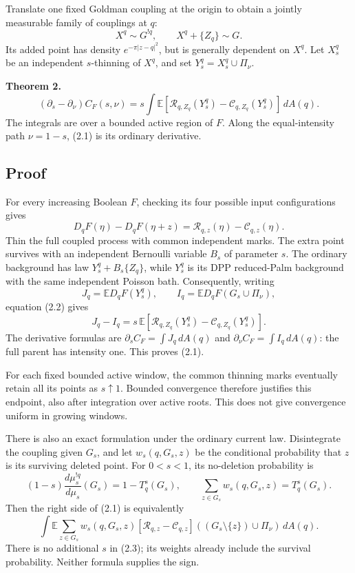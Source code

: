 \documentclass[11pt,a4paper]{article}
\theoremstyle{definition}
\theoremstyle{remark}
\numberwithin{equation}{section}
\begin{document}
Translate one fixed Goldman coupling at the origin to obtain a jointly measurable family of couplings at \(q\): \[
X^q\sim G^{!q},\qquad X^q+\{Z_q\}\sim G.
\] Its added point has density \(e^{-\pi|z-q|^2}\), but is generally dependent on \(X^q\). Let \(X_s^q\) be an independent \(s\)-thinning of \(X^q\), and set \(Y_s^q=X_s^q\cup\Pi_\nu\).

\textbf{Theorem 2.} \[
\boxed{\quad
(\partial_s-\partial_\nu)C_F(s,\nu)
=s\int
\mathbb E\!\left[
 \mathcal R_{q,Z_q}(Y_s^q)-\mathcal C_{q,Z_q}(Y_s^q)
\right]\,dA(q).
\quad}
\tag{2.1}
\] The integrals are over a bounded active region of \(F\). Along the equal-intensity path \(\nu=1-s\), (2.1) is its ordinary derivative.

\hypertarget{proof}{%
\subsection{Proof}\label{proof}}

For every increasing Boolean \(F\), checking its four possible input configurations gives \[
D_qF(\eta)-D_qF(\eta+z)
=\mathcal R_{q,z}(\eta)-\mathcal C_{q,z}(\eta).
\tag{2.2}
\] Thin the full coupled process with common independent marks. The extra point survives with an independent Bernoulli variable \(B_s\) of parameter \(s\). The ordinary background has law \(Y_s^q+B_s\{Z_q\}\), while \(Y_s^q\) is its DPP reduced-Palm background with the same independent Poisson bath. Consequently, writing \[
J_q=\mathbb ED_qF(Y_s^q),\qquad
I_q=\mathbb ED_qF(G_s\cup\Pi_\nu),
\] equation (2.2) gives \[
J_q-I_q
=s\,\mathbb E[
\mathcal R_{q,Z_q}(Y_s^q)-\mathcal C_{q,Z_q}(Y_s^q)].
\] The derivative formulas are \(\partial_s C_F=\int J_q\,dA(q)\) and \(\partial_\nu C_F=\int I_q\,dA(q)\): the full parent has intensity one. This proves (2.1).

For each fixed bounded active window, the common thinning marks eventually retain all its points as \(s\uparrow1\). Bounded convergence therefore justifies this endpoint, also after integration over active roots. This does not give convergence uniform in growing windows.

There is also an exact formulation under the ordinary current law. Disintegrate the coupling given \(G_s\), and let \(w_s(q,G_s,z)\) be the conditional probability that \(z\) is its surviving deleted point. For \(0<s<1\), its no-deletion probability is \[
(1-s)\frac{d\mu_s^{!q}}{d\mu_s}(G_s)=1-T_q^s(G_s),
\qquad
\sum_{z\in G_s}w_s(q,G_s,z)=T_q^s(G_s).
\] Then the right side of (2.1) is equivalently \[
\int\mathbb E\sum_{z\in G_s}w_s(q,G_s,z)
 [\mathcal R_{q,z}-\mathcal C_{q,z}]
 ((G_s\setminus\{z\})\cup\Pi_\nu)\,dA(q).
\tag{2.3}
\] There is no additional \(s\) in (2.3); its weights already include the survival probability. Neither formula supplies the sign.
\end{document}
